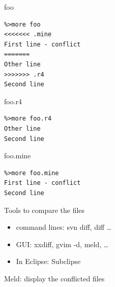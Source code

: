 \documentclass[12pt]{beamer}
\begin{document}
\begin{frame}[fragile]
	\begin{block}{foo}
		\begin{verbatim}
%>more foo
<<<<<<< .mine
First line - conflict
=======
Other line
>>>>>>> .r4
Second line
		\end{verbatim}
	\end{block}
	\begin{block}{foo.r4}
		\begin{verbatim}
%>more foo.r4
Other line
Second line
		\end{verbatim}
	\end{block}
	\begin{block}{foo.mine}
		\begin{verbatim}
%>more foo.mine 
First line - conflict
Second line
		\end{verbatim}
	\end{block}
\end{frame}


\begin{frame}[fragile]
	\begin{block}{Tools to compare the files}
		\begin{itemize}[<+->]
		  \item command lines: svn diff, diff \ldots
		  \item GUI: xxdiff, gvim -d, meld, \ldots
		  \item In Eclipse: Subclipse
		\end{itemize}
	\end{block}
\end{frame}

\begin{frame}[fragile]
	\begin{block}{Meld: display the conflicted files}
	\end{block}
\end{frame}
\end{document}

